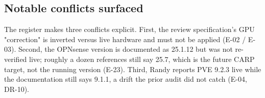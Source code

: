 \subsection{Notable conflicts surfaced}

The register makes three conflicts explicit. First, the review specification's GPU
"correction" is inverted versus live hardware and must not be applied (E-02 / E-03).
Second, the OPNsense version is documented as 25.1.12 but was not re-verified live;
roughly a dozen references still say 25.7, which is the future CARP target, not the
running version (E-23). Third, Randy reports PVE 9.2.3 live while the documentation
still says 9.1.1, a drift the prior audit did not catch (E-04, DR-10).
